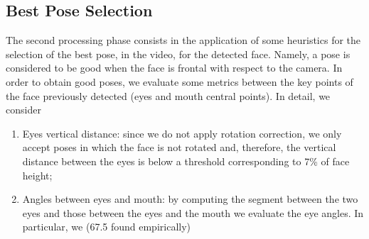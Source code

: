 \documentclass[10pt,a4paper]{report}
\begin{document}
\subsection*{Best Pose Selection}
The second processing phase consists in the application of some heuristics for the selection of the best pose, in the video, for the detected face. Namely, a pose is considered to be good when the face is frontal with respect to the camera. In order to obtain good poses, we evaluate some metrics between the key points of the face previously detected (eyes and mouth central points). In detail, we consider
\begin{enumerate}
\item Eyes vertical distance: since we do not apply rotation correction, we only accept poses in which the face is not rotated and, therefore, the vertical distance between the eyes is below a threshold corresponding to 7\% of face height;
\item Angles between eyes and mouth: by computing the segment between the two eyes and those between the eyes and the mouth we evaluate the eye angles. In particular, we  (67.5 found empirically)
\end{enumerate}
\end{document}
